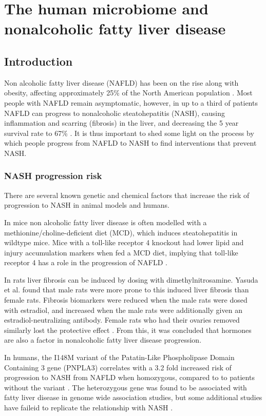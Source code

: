 \chapter{The human microbiome and nonalcoholic fatty liver disease}

\section{Introduction}
Non alcoholic fatty liver disease (NAFLD) has been on the rise along with obesity, affecting approximately 25\% of the North American population \cite{preiss2008non}. Most people with NAFLD remain asymptomatic, however, in up to a third of patients NAFLD can progress to nonalcoholic steatohepatitis (NASH), causing inflammation and scarring (fibrosis) in the liver, and decreasing the 5 year survival rate to 67\% \cite{propst1995prognosis}. It is thus important to shed some light on the process by which people progress from NAFLD to NASH to find interventions that prevent NASH.

\subsection{NASH progression risk}
There are several known genetic and chemical factors that increase the risk of progression to NASH in animal models and humans.

In mice non alcoholic fatty liver disease is often modelled with a methionine/choline-deficient diet (MCD), which induces steatohepatitis in wildtype mice. Mice with a toll-like receptor 4 knockout had lower lipid and injury accumulation markers when fed a MCD diet, implying that toll-like receptor 4 has a role in the progression of NAFLD \cite{rivera2007toll}.

In rats liver fibrosis can be induced by dosing with dimethylnitrosamine. Yasuda et al. \cite{yasuda1999suppressive} found that male rats were more prone to this induced liver fibrosis than female rats. Fibrosis biomarkers were reduced when the male rats were dosed with estradiol, and increased when the male rats were additionally given an estradiol-neutralizing antibody. Female rats who had their ovaries removed similarly lost the protective effect \cite{yasuda1999suppressive}. From this, it was concluded that hormones are also a factor in nonalcoholic fatty liver disease progression.

In humans, the I148M variant of the Patatin-Like Phospholipase Domain Containing 3 gene (PNPLA3) correlates with a 3.2 fold increased risk of progression to NASH from NAFLD when homozygous, compared to to patients without the variant \cite{sookoian2011meta}. The heterozygous gene was found to be associated with fatty liver disease in genome wide association studies, but some additional studies have faileid to replicate the relationship with NASH \cite{sookoian2011meta}.

